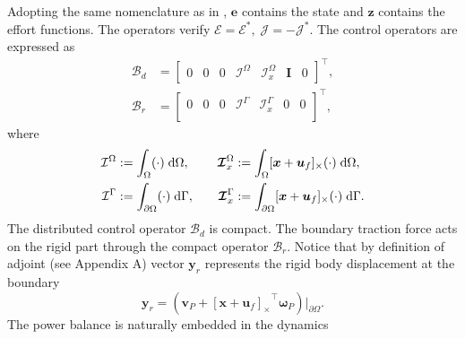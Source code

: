 \documentclass{svjour3}                     %
\newcommand{\crmat}[1]{\ensuremath{[#1]_{\times}}}
\begin{document}
Adopting the same nomenclature as in \cite{mehrmann2019structurepreserving}, $\bm{e}$ contains the state and $\bm{z}$ contains the effort functions. The operators verify $\bm{\mathcal{E}} = \bm{\mathcal{E}}^*, \; \bm{\mathcal{J}} = -\bm{\mathcal{J}}^*$. The control operators are expressed as
\begin{align*}
	\bm{\mathcal{B}}_d &= 
	\begin{bmatrix}
	0 & 0 & 0 & \mathcal{I}^\Omega & \bm{\mathcal{I}}_{x}^\Omega & \bm{I} & 0
	\end{bmatrix}^\top, \\
	 \bm{\mathcal{B}}_r &= 
	 \begin{bmatrix}
	0 & 0 & 0 & \mathcal{I}^{\Gamma} & \bm{\mathcal{I}}_{x}^{\Gamma} & 0 & 0 \\
	 \end{bmatrix}^\top,
\end{align*}
where 
\begin{equation*}
\begin{aligned}
\mathcal{I}^\Omega &:=\int_{\Omega} (\cdot) \d{\Omega}, \\
\mathcal{I}^{\Gamma} &:= \int_{\partial \Omega} (\cdot) \d{\Gamma}, \\
\end{aligned} \qquad
\begin{aligned} 
\bm{\mathcal{I}}_{x}^\Omega &:=\int_{\Omega} \crmat{\bm{x}+\bm{u}_f} (\cdot) \d{\Omega}, \\
\bm{\mathcal{I}}_{x}^{\Gamma} &:=\int_{\partial \Omega} \crmat{\bm{x}+\bm{u}_f} (\cdot) \d{\Gamma}. \\
\end{aligned}
\end{equation*}
The distributed control operator $\bm{\mathcal{B}}_d$  is compact. The boundary traction force acts on the rigid part through the compact operator $\bm{\mathcal{B}}_r$. Notice that by definition of adjoint (see Appendix A) vector $\bm{y}_r$ represents the rigid body displacement at the boundary
\[
\bm{y}_r = (\bm{v}_P + \crmat{\bm{x}+\bm{u}_f}^\top \bm{\omega}_P)\vert_{\partial\Omega}.
\] 
The power balance is naturally embedded in the dynamics 
\end{document}
